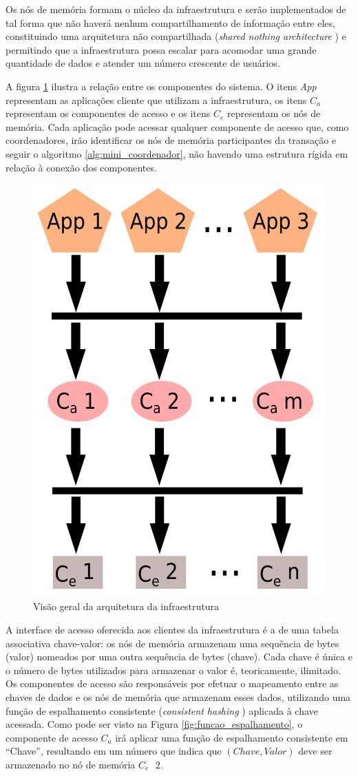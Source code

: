 \documentclass[11pt,twoside,a4paper]{book}
\begin{document}
Os nós de memória formam o núcleo da infraestrutura e serão implementados de tal forma que não haverá nenhum compartilhamento de informação entre eles, constituindo uma arquitetura não compartilhada (\emph{shared nothing architecture} \cite{shared_nothing}) e permitindo que a infraestrutura possa escalar para acomodar uma grande quantidade de dados e atender um número crescente de usuários.

A figura \ref{fig:overview_arquitetura} ilustra a relação entre os componentes do sistema. O itens \emph{App} representam as aplicações cliente que utilizam a infraestrutura, os itens \emph{$C_a$} representam os componentes de acesso e os itens \emph{$C_e$} representam os nós de memória. Cada aplicação pode acessar qualquer componente de acesso que, como coordenadores, irão identificar os nós de memória participantes da transação e seguir o algoritmo \ref{alg:mini_coordenador}, não havendo uma estrutura rígida em relação à conexão dos componentes.

\begin{figure}
  \centering
  \includegraphics[width=.40\textwidth]{overview_arquitetura} 
  \caption{Visão geral da arquitetura da infraestrutura}
  \label{fig:overview_arquitetura} 
\end{figure}

A interface de acesso oferecida aos clientes da infraestrutura é a de uma tabela associativa chave-valor: os nós de memória armazenam uma sequência de bytes (valor) nomeados por uma outra sequência de bytes (chave). Cada chave é única e o número de bytes utilizados para armazenar o valor é, teoricamente, ilimitado. Os componentes de acesso são responsáveis por efetuar o mapeamento entre as chaves de dados e os nós de memória que armazenam esses dados, utilizando uma função de espalhamento consistente (\emph{consistent hashing} \cite{consistent_hashing}) aplicada à chave acessada. Como pode ser visto na Figura \ref{fig:funcao_espalhamento}, o componente de acesso $C_a$ irá aplicar uma função de espalhamento consistente em ``Chave'', resultando em um número que indica que $(Chave, Valor)$ deve ser armazenado no nó de memória $C_e\text{ }2$.
\end{document}
